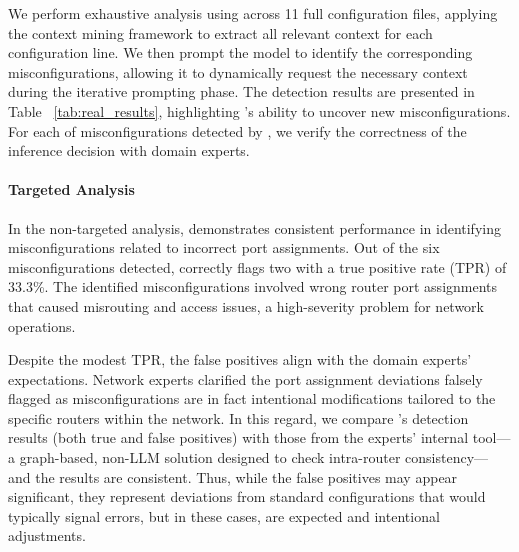 We perform exhaustive analysis using \sysname{} across 11 full configuration files, applying the context mining framework to extract all relevant context for each configuration line. We then prompt the model to identify the corresponding misconfigurations, allowing it to dynamically request the necessary context during the iterative prompting phase. The detection results are presented in Table ~\ref{tab:real_results}, highlighting \sysname{}'s ability to uncover new misconfigurations. For each of misconfigurations detected by \sysname{}, we verify the correctness of the inference decision with domain experts. 

\paragraph{Targeted Analysis} 
In the non-targeted analysis, \sysname{} demonstrates consistent performance
in identifying misconfigurations related to incorrect port assignments. Out of the six misconfigurations detected, \sysname{} correctly flags two with a true positive rate (TPR) of 33.3\%. The identified misconfigurations involved wrong router port assignments that caused misrouting and access issues, a high-severity problem for network operations.

Despite the modest TPR, the false positives align with the domain experts' expectations. Network experts clarified the port assignment deviations falsely flagged as misconfigurations are in fact intentional modifications tailored to the specific routers within the network. In this regard, we compare \sysname{}'s detection results (both true and false positives) with those from the experts' internal tool—a graph-based, non-LLM solution designed to check intra-router consistency— and the results are consistent.
Thus, while the false positives may appear significant, they represent deviations from standard configurations that would typically signal errors, but in these cases, are expected and intentional adjustments.


